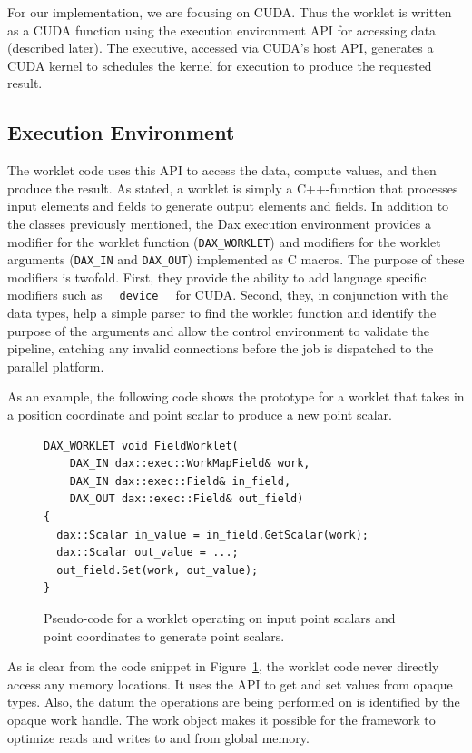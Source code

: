 \documentclass{vgtc}                          %
\newcommand*{\textC}[1]{\texttt{#1}}
\begin{document}
For our implementation, we are focusing on CUDA. Thus the worklet is
written as a CUDA function using the execution environment API for accessing data
(described later). The executive, accessed via CUDA's host API,
generates a CUDA kernel to schedules the kernel for execution to produce
the requested result.

\subsection{Execution Environment}
\label{sec:ExecutionEnvironment}

The worklet code uses this API to access the data, compute values, and then
produce the result. As stated, a worklet is simply a C++-function that
processes input elements and fields to generate output elements and
fields. In addition to the classes previously mentioned, the Dax execution
environment provides a modifier for the worklet function
(\textC{DAX\_WORKLET}) and modifiers for the worklet arguments
(\textC{DAX\_IN} and \textC{DAX\_OUT}) implemented as C macros.  The
purpose of these modifiers is twofold.  First, they provide the ability to
add language specific modifiers such as \textC{\_\_device\_\_} for CUDA.
Second, they, in conjunction with the data types, help a simple parser to
find the worklet function and identify the purpose of the arguments and
allow the control environment to validate the pipeline, catching any
invalid connections before the job is dispatched to the parallel platform.

As an example, the following code shows the prototype for a worklet that
takes in a position coordinate and point scalar to produce a new point
scalar.

\begin{figure}[htbp]
\begin{lstlisting}[language=Dax]
DAX_WORKLET void FieldWorklet(
    DAX_IN dax::exec::WorkMapField& work,
    DAX_IN dax::exec::Field& in_field,
    DAX_OUT dax::exec::Field& out_field)
{
  dax::Scalar in_value = in_field.GetScalar(work);
  dax::Scalar out_value = ...;
  out_field.Set(work, out_value);
}
\end{lstlisting}
\caption{Pseudo-code for a worklet operating on input point scalars and point
coordinates to generate point scalars.}
\label{fig:DaxPointWorklet}
\end{figure}

As is clear from the code snippet in Figure~\ref{fig:DaxPointWorklet}, the worklet code never directly access
any memory locations. It uses the API to get and set values from opaque types. Also,
the datum the operations are being performed on is identified by the opaque work
handle. The work object makes it possible for the framework to optimize
reads and writes to and from global memory.
\end{document}
